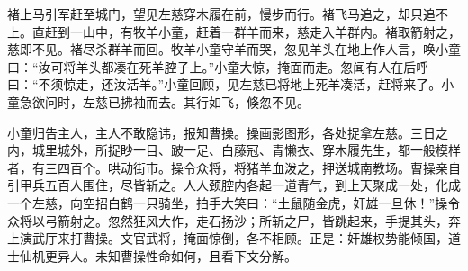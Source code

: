 褚上马引军赶至城门，望见左慈穿木履在前，慢步而行。褚飞马追之，却只追不上。直赶到一山中，有牧羊小童，赶着一群羊而来，慈走入羊群内。褚取箭射之，慈即不见。褚尽杀群羊而回。牧羊小童守羊而哭，忽见羊头在地上作人言，唤小童曰：“汝可将羊头都凑在死羊腔子上。”小童大惊，掩面而走。忽闻有人在后呼曰：“不须惊走，还汝活羊。”小童回顾，见左慈已将地上死羊凑活，赶将来了。小童急欲问时，左慈已拂袖而去。其行如飞，倏忽不见。

小童归告主人，主人不敢隐讳，报知曹操。操画影图形，各处捉拿左慈。三日之内，城里城外，所捉眇一目、跛一足、白藤冠、青懒衣、穿木履先生，都一般模样者，有三四百个。哄动街市。操令众将，将猪羊血泼之，押送城南教场。曹操亲自引甲兵五百人围住，尽皆斩之。人人颈腔内各起一道青气，到上天聚成一处，化成一个左慈，向空招白鹤一只骑坐，拍手大笑曰：“土鼠随金虎，奸雄一旦休！”操令众将以弓箭射之。忽然狂风大作，走石扬沙；所斩之尸，皆跳起来，手提其头，奔上演武厅来打曹操。文官武将，掩面惊倒，各不相顾。正是：奸雄权势能倾国，道士仙机更异人。未知曹操性命如何，且看下文分解。